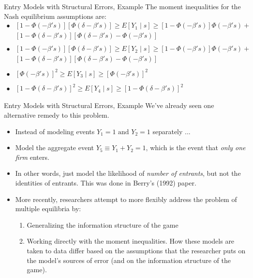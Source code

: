 \begin{frame}{Entry Models with Structural Errors, Example}
The moment inequalities for the Nash equilibrium assumptions are:
\begin{equation*}
\begin{split}
\bullet & [1- \Phi(-\beta 's)][\Phi(\delta - \beta 's)] \geq E[Y_1 \mid s] \geq [1 -\Phi(-\beta 's)] \Phi(-\beta 's) + \\ 
& [1 - \Phi(\delta - \beta 's)][\Phi(\delta - \beta 's) - \Phi(-\beta 's)] \\ \\
\bullet & [1- \Phi(-\beta 's)][\Phi(\delta - \beta 's)] \geq E[Y_2 \mid s] \geq [1 -\Phi(-\beta 's)] \Phi(-\beta 's) + \\ 
& [1 - \Phi(\delta - \beta 's)][\Phi(\delta - \beta 's) - \Phi(-\beta 's)] \\ \\
\bullet & [\Phi(-\beta 's)]^2 \geq E[Y_3 \mid s] \geq [\Phi (-\beta 's)]^2 \\ \\
\bullet & [1 - \Phi (\delta - \beta 's)]^2 \geq E[Y_4 \mid s] \geq [1 - \Phi (\delta - \beta 's)]^2
\end{split}
\end{equation*}
\end{frame}
\begin{frame}{Entry Models with Structural Errors, Example}
We've already seen one alternative remedy to this problem. 
\begin{itemize}
\item Instead of modeling events $Y_1 = 1 \text{ and } Y_2 = 1$ separately ...
\item Model the aggregate event $Y_5 \equiv Y_1 + Y_2 = 1$, which is the event that \emph{only one firm} enters.
\item In other words, just model the likelihood of \emph{number of entrants}, but not the identities of entrants. This was done in Berry's (1992) paper. 
\item More recently, researchers attempt to more flexibly address the problem of multiple equilibria by:
\begin{enumerate} 
\item Generalizing the information structure of the game
\item Working directly with the moment inequalities.  How these models are taken to data differ based on the assumptions that the researcher puts on the model's sources of error (and on the information structure of the game).
\end{enumerate}
\end{itemize}
\end{frame}

